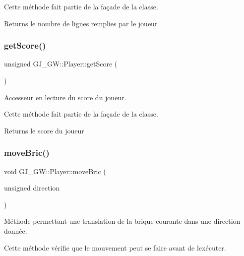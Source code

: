 Cette méthode fait partie de la façade de la classe.

\begin{DoxyReturn}{Returns}
le nombre de lignes remplies par le joueur 
\end{DoxyReturn}
\hypertarget{class_g_j___g_w_1_1_player_ae3f20da9bd95ea3da68fe0948e76bf09}{}\label{class_g_j___g_w_1_1_player_ae3f20da9bd95ea3da68fe0948e76bf09} 
\subsubsection{\texorpdfstring{get\+Score()}{getScore()}}
{\footnotesize\ttfamily unsigned G\+J\+\_\+\+G\+W\+::\+Player\+::get\+Score (\begin{DoxyParamCaption}{ }\end{DoxyParamCaption})\hspace{0.3cm}{\ttfamily [inline]}}



Accesseur en lecture du score du joueur. 

Cette méthode fait partie de la façade de la classe.

\begin{DoxyReturn}{Returns}
le score du joueur 
\end{DoxyReturn}
\hypertarget{class_g_j___g_w_1_1_player_a0a00d8967ff1b71876bc5a8da4736729}{}\label{class_g_j___g_w_1_1_player_a0a00d8967ff1b71876bc5a8da4736729} 
\subsubsection{\texorpdfstring{move\+Bric()}{moveBric()}}
{\footnotesize\ttfamily void G\+J\+\_\+\+G\+W\+::\+Player\+::move\+Bric (\begin{DoxyParamCaption}\item[{unsigned}]{direction }\end{DoxyParamCaption})}



Méthode permettant une translation de la brique courante dans une direction donnée. 

Cette méthode vérifie que le mouvement peut se faire avant de l\textquotesingle{}exécuter.


